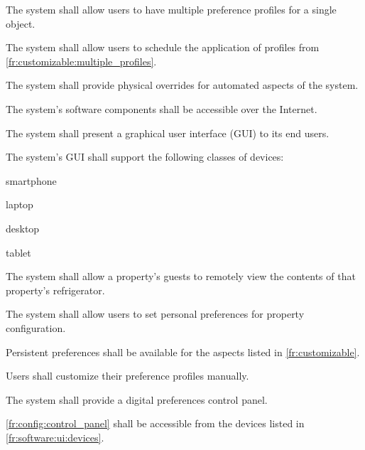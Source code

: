 \documentclass[letter,titlepage,oneside,english]{report}
\begin{document}
\begin{fr}
\begin{fr}
  \item\label{fr:customizable:multiple_profiles}
    The system shall allow users to have multiple preference profiles for a single object.
  \item
    The system shall allow users to schedule the application of profiles from \ref{fr:customizable:multiple_profiles}.
  \item
    The system shall provide physical overrides for automated aspects of the system.
  \end{fr}
\item\label{fr:software}
  The system's software components shall be accessible over the Internet.
  \begin{fr}
  \item\label{fr:software:ui}
    The system shall present a graphical user interface (GUI) to its end users.
    \begin{fr}
    \item\label{fr:software:ui:devices}
      The system's GUI shall support the following classes of devices:
      \begin{fr}
      \item
        smartphone
      \item
        laptop
      \item
        desktop
      \item
        tablet
      \end{fr}
    \end{fr}
  \item\label{fr:software:fridge}
    The system shall allow a property's guests to remotely view the contents of that property's refrigerator.
  \end{fr}
\item
  The system shall allow users to set personal preferences for property configuration.
  \begin{fr}
  \item
    Persistent preferences shall be available for the aspects listed in \ref{fr:customizable}.
  \item
    Users shall customize their preference profiles manually.
  \item\label{fr:config:control_panel}
    The system shall provide a digital preferences control panel.
    \begin{fr}
    \item\label{fr:config:control_panel:devices}
      \ref{fr:config:control_panel} shall be accessible from the devices listed in \ref{fr:software:ui:devices}.
    \end{fr}

\end{fr}
\end{fr}
\end{document}
